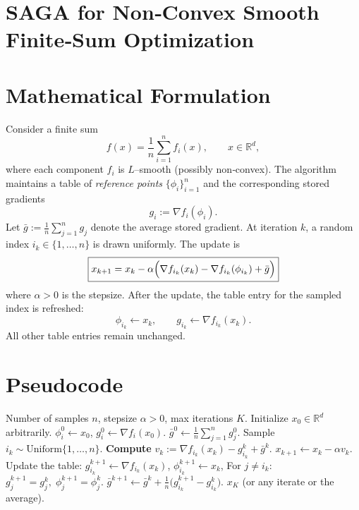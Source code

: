 \documentclass{article}
\newcommand{\R}{\mathbb{R}}
\newcommand{\grad}{\nabla}
\begin{document}
\section*{SAGA for Non‑Convex Smooth Finite‑Sum Optimization}

\section*{Mathematical Formulation}
Consider a finite sum
\[
f(x)=\frac{1}{n}\sum_{i=1}^{n} f_i(x),\qquad x\in\R^{d},
\]
where each component $f_i$ is $L$–smooth (possibly non‑convex).  
The algorithm maintains a table of \emph{reference points} $\{\phi_i\}_{i=1}^{n}$ and the corresponding stored gradients
\[
g_i:=\grad f_i(\phi_i).
\]
Let $\bar g:=\frac{1}{n}\sum_{j=1}^{n} g_j$ denote the average stored gradient.  
At iteration $k$, a random index $i_k\in\{1,\dots,n\}$ is drawn uniformly. The update is
\begin{equation}
\boxed{
x_{k+1}=x_{k}-\alpha\Bigl(\grad f_{i_k}(x_k)-\grad f_{i_k}(\phi_{i_k})+\bar g\Bigr)
}\label{eq:update}
\end{equation}
where $\alpha>0$ is the stepsize.  
After the update, the table entry for the sampled index is refreshed:
\[
\phi_{i_k}\gets x_{k},\qquad 
g_{i_k}\gets \grad f_{i_k}(x_{k}).
\]
All other table entries remain unchanged.

\section*{Pseudocode}
\begin{algorithm}[H]
\caption{SAGA (non‑convex version)}
\begin{algorithmic}[1]
\Require Number of samples $n$, stepsize $\alpha>0$, max iterations $K$.
\State Initialize $x_{0}\in\R^{d}$ arbitrarily.
    \State $\phi_i^{0}\gets x_{0}$, \; $g_i^{0}\gets \grad f_i(x_{0})$.
\EndFor
\State $\bar g^{0}\gets \frac{1}{n}\sum_{j=1}^{n} g_j^{0}$.
    \State Sample $i_k\sim\text{Uniform}\{1,\dots,n\}$.
    \State \textbf{Compute} $v_k:=\grad f_{i_k}(x_{k})-g_{i_k}^{k}+\bar g^{k}$.
    \State $x_{k+1}\gets x_{k}-\alpha v_k$.
    \State Update the table:
    \State\quad $g_{i_k}^{k+1}\gets \grad f_{i_k}(x_{k})$, \;
          $\phi_{i_k}^{k+1}\gets x_{k}$,
    \State\quad For $j\neq i_k$: $g_{j}^{k+1}=g_{j}^{k},\;\phi_{j}^{k+1}=\phi_{j}^{k}$.
    \State $\bar g^{k+1}\gets \bar g^{k}+\frac{1}{n}\bigl(g_{i_k}^{k+1}-g_{i_k}^{k}\bigr)$.
\EndFor
\State \Return $x_{K}$ (or any iterate or the average).
\end{algorithmic}
\end{algorithm}
\end{document}
